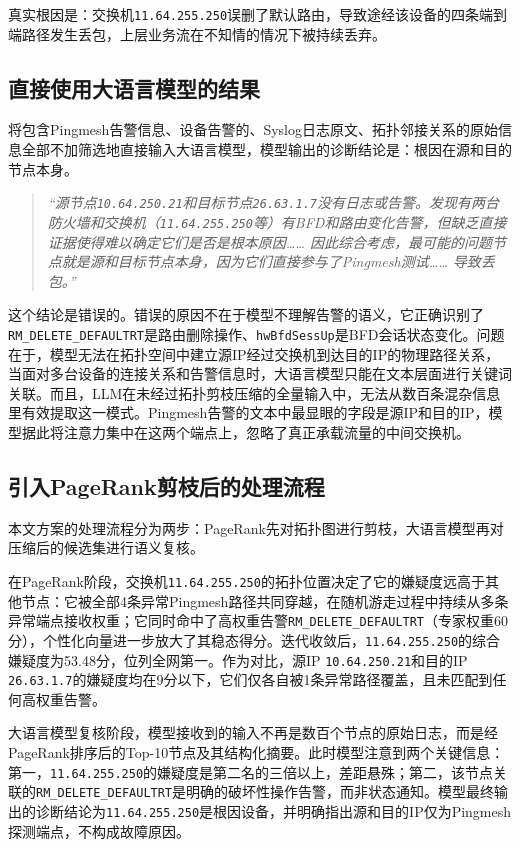真实根因是：交换机\texttt{11.64.255.250}误删了默认路由，导致途经该设备的四条端到端路径发生丢包，上层业务流在不知情的情况下被持续丢弃。

\subsection{直接使用大语言模型的结果}

将包含Pingmesh告警信息、设备告警的、Syslog日志原文、拓扑邻接关系的原始信息全部不加筛选地直接输入大语言模型，模型输出的诊断结论是：根因在源和目的节点本身。

\begin{quote}\itshape
    “源节点\texttt{10.64.250.21}和目标节点\texttt{26.63.1.7}没有日志或告警。发现有两台防火墙和交换机（\texttt{11.64.255.250}等）有BFD和路由变化告警，但缺乏直接证据使得难以确定它们是否是根本原因…… 因此综合考虑，最可能的问题节点就是源和目标节点本身，因为它们直接参与了Pingmesh测试…… 导致丢包。”
\end{quote}

这个结论是错误的。错误的原因不在于模型不理解告警的语义，它正确识别了\texttt{RM\_DELETE\_DEFAULTRT}是路由删除操作、\texttt{hwBfdSessUp}是BFD会话状态变化。问题在于，模型无法在拓扑空间中建立源IP经过交换机到达目的IP的物理路径关系，当面对多台设备的连接关系和告警信息时，大语言模型只能在文本层面进行关键词关联。而且，LLM在未经过拓扑剪枝压缩的全量输入中，无法从数百条混杂信息里有效提取这一模式。Pingmesh告警的文本中最显眼的字段是源IP和目的IP，模型据此将注意力集中在这两个端点上，忽略了真正承载流量的中间交换机。

\subsection{引入PageRank剪枝后的处理流程}

本文方案的处理流程分为两步：PageRank先对拓扑图进行剪枝，大语言模型再对压缩后的候选集进行语义复核。

在PageRank阶段，交换机\texttt{11.64.255.250}的拓扑位置决定了它的嫌疑度远高于其他节点：它被全部4条异常Pingmesh路径共同穿越，在随机游走过程中持续从多条异常端点接收权重；它同时命中了高权重告警\texttt{RM\_DELETE\_DEFAULTRT}（专家权重60分），个性化向量进一步放大了其稳态得分。迭代收敛后，\texttt{11.64.255.250}的综合嫌疑度为53.48分，位列全网第一。作为对比，源IP \texttt{10.64.250.21}和目的IP \texttt{26.63.1.7}的嫌疑度均在9分以下，它们仅各自被1条异常路径覆盖，且未匹配到任何高权重告警。

大语言模型复核阶段，模型接收到的输入不再是数百个节点的原始日志，而是经PageRank排序后的Top-10节点及其结构化摘要。此时模型注意到两个关键信息：第一，\texttt{11.64.255.250}的嫌疑度是第二名的三倍以上，差距悬殊；第二，该节点关联的\texttt{RM\_DELETE\_DEFAULTRT}是明确的破坏性操作告警，而非状态通知。模型最终输出的诊断结论为\texttt{11.64.255.250}是根因设备，并明确指出源和目的IP仅为Pingmesh探测端点，不构成故障原因。

